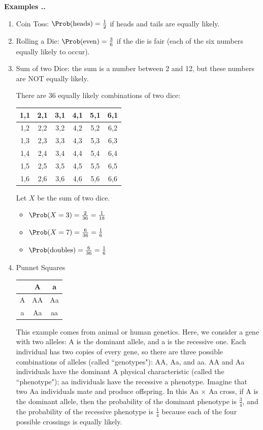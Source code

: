 \documentclass[twoside]{book}\usepackage[]{graphicx}\usepackage[]{xcolor}
\newcounter{example}[section]
\newenvironment{examples}%
{\refstepcounter{example}%
\textbf{Examples \thesection.\arabic{example}. }}%
{}
\begin{document}
\begin{examples}
\begin{enumerate}
\item Coin Toss: $\Prob(\mbox{heads}) = \frac{1}{2}$ if heads and tails are 
equally likely.
\item Rolling a Die: $\Prob(\mbox{even}) = \frac{3}{6}$ if the die is 
fair (each of the six numbers equally likely to occur).
\item
Sum of two Dice: the sum is a number between 2 and 12, but these numbers
are NOT equally likely.  

There are 36 equally likely combinations of two dice:

\begin{center}
\large
\begin{tabular}{|*{6}{c|}}
\hline
1,1 & 2,1 & 3,1 & 4,1 & 5,1 & 6,1 
\\ \hline
1,2 & 2,2 & 3,2 & 4,2 & 5,2 & 6,2 
\\ \hline
1,3 & 2,3 & 3,3 & 4,3 & 5,3 & 6,3 
\\ \hline
1,4 & 2,4 & 3,4 & 4,4 & 5,4 & 6,4 
\\ \hline
1,5 & 2,5 & 3,5 & 4,5 & 5,5 & 6,5 
\\ \hline
1,6 & 2,6 & 3,6 & 4,6 & 5,6 & 6,6
\\ \hline
\end{tabular}
\end{center}

Let $X$ be the sum of two dice.
\begin{itemize}
\item $\Prob(X=3) = \frac{2}{36} = \frac{1}{18}$
\item $\Prob(X=7) = \frac{6}{36} = \frac{1}{6}$
\item $\Prob(\mbox{doubles}) = \frac{6}{36} = \frac{1}{6}$
\end{itemize}

\newpage

\item
Punnet Squares

\begin{center}
\large
\begin{tabular}{c|cc}
& A & a \\ \hline
A & AA & Aa \\ 
a & Aa & aa \\ 
\end{tabular}
\end{center}
This example comes from animal or human genetics. Here, we consider a gene with two alleles:  A is the dominant allele, and a is the recessive one.  Each individual has two copies of every gene, so there are three possible combinations of alleles (called ``genotypes"): AA, Aa, and aa. AA and Aa individuals have the dominant A physical characteristic (called the ``phenotype"); aa individuals have the recessive a phenotype. Imagine that two Aa individuals mate and produce offspring. In this Aa $\times$ Aa cross,
if A is the dominant allele, then the probability of the dominant
phenotype is $\frac{3}{4}$, and the probability of the recessive 
phenotype is $\frac{1}{4}$ because each of the four possible crossings is equally likely.


\end{enumerate}
\end{examples}
\end{document}
